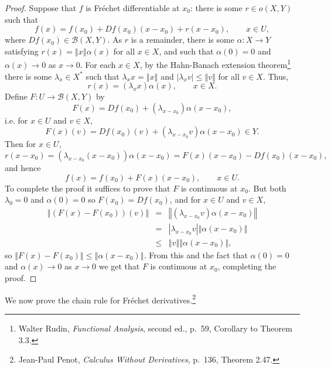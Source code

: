 \documentclass{article}
\newcommand{\norm}[1]{\left\Vert #1 \right\Vert}
\theoremstyle{definition}
\begin{document}
\begin{proof}
Suppose that $f$ is Fr\'echet differentiable at $x_0$: there is some $r \in o(X,Y)$ such that
\[
f(x)=f(x_0)+Df(x_0)(x-x_0)+r(x-x_0), \qquad x \in U,
\]
where $Df(x_0) \in \mathscr{B}(X,Y)$. As $r$ is a remainder, there is some
$\alpha:X \to Y$ satisfying $r(x)=\norm{x}\alpha(x)$ for all $x \in X$, and such that $\alpha(0)=0$ and $\alpha(x) \to 0$ 
as $x \to 0$.
For each $x \in X$, by the Hahn-Banach extension
theorem\footnote{Walter Rudin, {\em Functional Analysis}, second ed., p.~59, Corollary to Theorem 3.3.}
there is some $\lambda_x \in X^*$ such that $\lambda_x x = \norm{x}$ and $|\lambda_x v| \leq \norm{v}$ for all $v \in X$.
Thus,
\[
r(x)=(\lambda_x x)\alpha(x), \qquad x \in X.
\]
Define $F:U \to \mathscr{B}(X,Y)$ by
\[
F(x)=Df(x_0)+(\lambda_{x-x_0})\alpha(x-x_0),
\]
i.e. for $x \in U$ and $v \in X$,
\[
F(x)(v)=Df(x_0)(v)+(\lambda_{x-x_0} v) \alpha(x-x_0) \in Y.
\]
Then for $x \in U$,
\[
r(x-x_0)=(\lambda_{x-x_0}(x-x_0))\alpha(x-x_0)=F(x)(x-x_0)-Df(x_0)(x-x_0),
\]
and hence
\[
f(x)=f(x_0)+F(x)(x-x_0), \qquad x \in U.
\]
To complete the proof  it suffices to prove that $F$ is continuous at $x_0$. But both $\lambda_0=0$ and $\alpha(0)=0$ so
$F(x_0)=Df(x_0)$, and for  $x \in U$ and $v \in X$,
\begin{eqnarray*}
\norm{(F(x)-F(x_0))(v)}&=&\norm{(\lambda_{x-x_0}v)\alpha(x-x_0)}\\
&=&|\lambda_{x-x_0}v| \norm{\alpha(x-x_0)}\\
&\leq& \norm{v} \norm{\alpha(x-x_0)},
\end{eqnarray*}
so $\norm{F(x)-F(x_0)} \leq \norm{\alpha(x-x_0)}$. From this and the fact that $\alpha(0)=0$ and $\alpha(x) \to 0$ as $x \to 0$
we get that $F$ is continuous at $x_0$, completing the proof.
\end{proof}

We now prove the chain rule for Fr\'echet derivatives.\footnote{Jean-Paul Penot,
{\em Calculus Without Derivatives}, p.~136, Theorem 2.47.}
\end{document}
